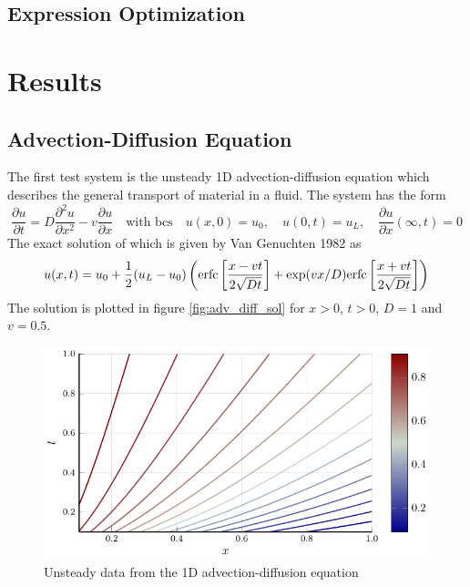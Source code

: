 \documentclass{article}
\begin{document}
\subsection{Expression Optimization}



\section{Results}
\label{results}

\subsection{Advection-Diffusion Equation}

The first test system is the unsteady 1D advection-diffusion equation which describes the general transport of material in a fluid. The system has the form
\[ \frac{\partial u}{\partial t} = D\frac{\partial^2 u}{\partial x^2} - v \frac{\partial u}{\partial x} \quad \text{with bcs} \quad u(x,0) = u_0, \quad
u(0,t) = u_L, \quad
\frac{\partial u}{\partial x}(\infty, t) = 0 \]
The exact solution of which is given by Van Genuchten 1982 as
\[ u(x,t) = u_0 + \frac{1}{2}(u_L - u_0) \left({\rm erfc}\left[ \frac{x - vt}{2\sqrt{Dt}}\right] + {\rm exp}(vx/D) {\rm erfc}\left[ \frac{x + vt}{2\sqrt{Dt}}\right] \right) \]
The solution is plotted in figure \ref{fig:adv_diff_sol} for $x>0$, $t>0$, $D=1$ and $v=0.5$.

\begin{figure}[ht]
\vskip 0.2in
\begin{center}
\centerline{\includegraphics[width=\columnwidth]{figures/advdif}}
\caption{Unsteady data from the 1D advection-diffusion equation}
\label{advdif}
\end{center}
\vskip -0.2in
\end{figure}
\end{document}
